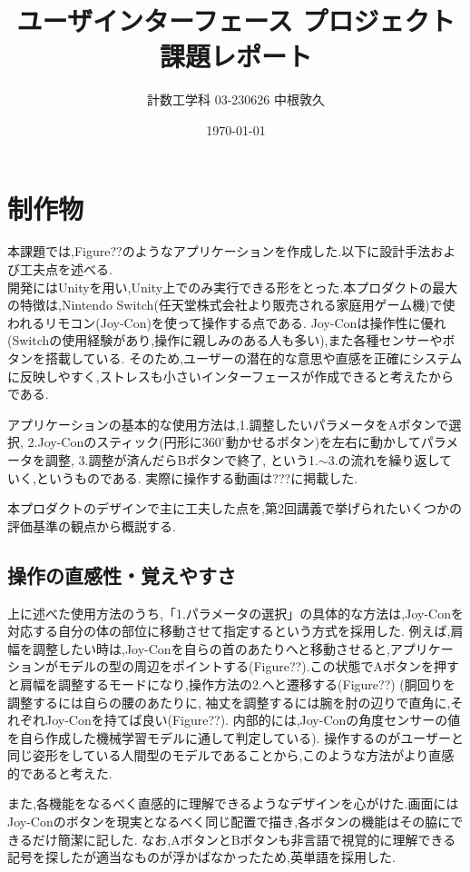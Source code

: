 \documentclass[dvipdfmx]{jsarticle}
\title{ユーザインターフェース プロジェクト課題レポート}
\author{計数工学科 03-230626 中根敦久}
\date{\today}
\newcommand{\1}{\mbox{1}\hspace{-0.25em}\mbox{l}}
\begin{document}
\maketitle
\section{制作物}
本課題では,Figure??のようなアプリケーションを作成した.以下に設計手法および工夫点を述べる. \\
開発にはUnityを用い,Unity上でのみ実行できる形をとった.本プロダクトの最大の特徴は,Nintendo Switch(任天堂株式会社より販売される家庭用ゲーム機)で使われるリモコン(Joy-Con)を使って操作する点である.
Joy-Conは操作性に優れ(Switchの使用経験があり,操作に親しみのある人も多い),また各種センサーやボタンを搭載している.
そのため,ユーザーの潜在的な意思や直感を正確にシステムに反映しやすく,ストレスも小さいインターフェースが作成できると考えたからである.

アプリケーションの基本的な使用方法は,1.調整したいパラメータをAボタンで選択, 2.Joy-Conのスティック(円形に$360^{\circ}$動かせるボタン)を左右に動かしてパラメータを調整, 3.調整が済んだらBボタンで終了, という1.$\sim$3.の流れを繰り返していく,というものである.
実際に操作する動画は???に掲載した.

本プロダクトのデザインで主に工夫した点を,第2回講義で挙げられたいくつかの評価基準の観点から概説する.

\subsection*{操作の直感性・覚えやすさ}
上に述べた使用方法のうち,「1.パラメータの選択」の具体的な方法は,Joy-Conを対応する自分の体の部位に移動させて指定するという方式を採用した.
例えば,肩幅を調整したい時は,Joy-Conを自らの首のあたりへと移動させると,アプリケーションがモデルの型の周辺をポイントする(Figure??).この状態でAボタンを押すと肩幅を調整するモードになり,操作方法の2.へと遷移する(Figure??)
(胴回りを調整するには自らの腰のあたりに, 袖丈を調整するには腕を肘の辺りで直角に,それぞれJoy-Conを持てば良い(Figure??). 内部的には,Joy-Conの角度センサーの値を自ら作成した機械学習モデルに通して判定している).
操作するのがユーザーと同じ姿形をしている人間型のモデルであることから,このような方法がより直感的であると考えた.

また,各機能をなるべく直感的に理解できるようなデザインを心がけた.画面にはJoy-Conのボタンを現実となるべく同じ配置で描き,各ボタンの機能はその脇にできるだけ簡潔に記した.
なお,AボタンとBボタンも非言語で視覚的に理解できる記号を探したが適当なものが浮かばなかったため,英単語を採用した.
\end{document}
